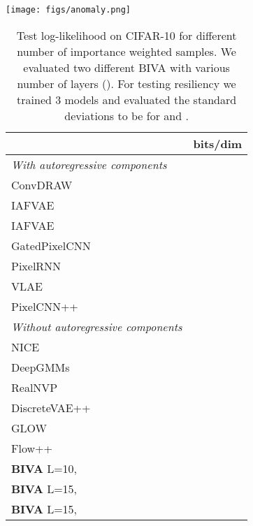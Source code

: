 \documentclass{article}
\def\nm{BIVA\xspace}
\def\abovestrut#1{\rule[0in]{0in}{#1}\ignorespaces}
\def\abovespace{\abovestrut{0.20in}}
\begin{document}
\begin{table}[t]
    	\begin{minipage}{0.48\linewidth}
		\centering
		\texttt{[image: figs/anomaly.png]}
		\label{fig:anomaly}
	\end{minipage}
	\hfill
	\begin{minipage}{0.48\linewidth}
		    \vspace*{-1.8cm}
\begin{small}
\vspace{-0.8cm}
\begin{sc}
\caption{Test log-likelihood on CIFAR-10
for different number of importance weighted samples. We evaluated two different \nm with various number of layers (). For testing resiliency we trained 3 models and evaluated the standard deviations to be  for  and .
}\label{table:cifar}
\vspace*{-0.1cm}
\begin{tabular}{l c}
 & bits/dim \\
\hline
\textit{With autoregressive components} \\
ConvDRAW {\scriptsize\cite{Gregor16}} & \\
IAFVAE  {\scriptsize\cite{Kingma2016}} & \\
IAFVAE  {\scriptsize\cite{Kingma2016}} & \\
GatedPixelCNN {\scriptsize\cite{Oord16}} & \\
PixelRNN {\scriptsize\cite{Oord2015}} & \\
VLAE {\scriptsize\cite{Chen2017}} & \\
PixelCNN++ {\scriptsize\cite{Salimans17}} & \\
\hline
 \textit{Without autoregressive components} \\
NICE {\scriptsize\cite{Dinh14}} & \\
DeepGMMs {\scriptsize\cite{Oord14}} & \\
RealNVP {\scriptsize\cite{Dinh16}} & \\
DiscreteVAE++ {\scriptsize\cite{Vahdat18}} & \\
GLOW {\scriptsize\cite{Kingma18}} & \\
Flow++ {\scriptsize\cite{Ho19}} & \\
\abovespace
\textbf{\nm} L=10,  &  \\
\textbf{\nm} L=15,  &  \\
\textbf{\nm} L=15,  &  \\
\hline
\end{tabular}\end{sc}
\end{small}
\end{minipage}
	\vspace*{-0.5cm}
\end{table}
\end{document}

